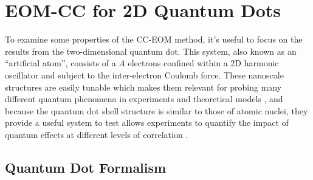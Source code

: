\documentclass[thesis.tex]{subfiles}
\begin{document}
\section{EOM-CC for 2D Quantum Dots} \label{section:eom_qd}

To examine some properties of the CC-EOM method, it's useful to focus on the results from the two-dimensional quantum dot.  This system, also known as an ``artificial atom'', consists of a $A$ electrons confined within a 2D harmonic oscillator and subject to the inter-electron Coulomb force.  These nanoscale structures are easily tunable which makes them relevant for probing many different quantum phenomena in experiments and theoretical models \cite{REIMANN2002,ENGEL1993,BIRMAN20131}, and because the quantum dot shell structure is similar to those of atomic nuclei, they provide a useful system to test  allows experiments to quantify the impact of quantum effects at different levels of correlation \cite{TARUCHA1996}.

\subsection{Quantum Dot Formalism}
\end{document}
